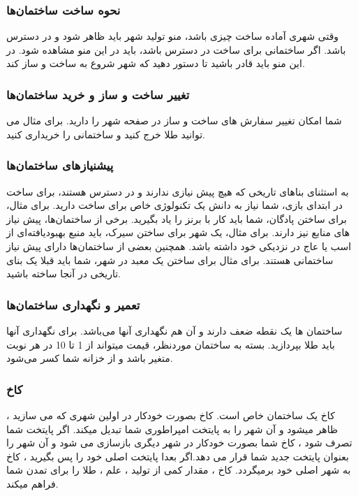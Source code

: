 \documentclass[]{article}
\begin{document}
\subsubsection*{{\titr نحوه ساخت ساختمان‌ها}}
وقتی شهری آماده ساخت چیزی باشد، منو تولید شهر باید ظاهر شود و در دسترس باشد. اگر ساختمانی برای ساخت در دسترس باشد، باید در این منو مشاهده شود. در این منو باید قادر باشید تا دستور دهید که شهر شروع به ساخت و ساز کند.


\subsubsection*{{\titr تغییر ساخت و ساز و خرید ساختمان‌ها}}
شما امکان تغییر سفارش های ساخت و ساز در صفحه شهر را دارید. برای مثال می توانید طلا خرج کنید و ساختمانی را خریداری کنید.


\subsubsection*{{\titr پیشنیاز‌های ساختمان‌ها}}
به استثنای بناهای تاریخی که هیچ پیش نیازی ندارند و در دسترس هستند، برای ساخت در ابتدای بازی، شما نیاز به دانش یک تکنولوژی خاص برای ساخت دارید. برای مثال، برای ساختن پادگان، شما باید کار با برنز را یاد بگیرید.
برخی از ساختمان‌ها، پیش نیاز های منابع نیز دارند. برای مثال، یک شهر برای ساختن سیرک، باید منبع بهبودیافته‌ای از اسب یا عاج در نزدیکی خود داشته باشد.
همچنین بعضی از ساختمان‌ها دارای پیش نیاز ساختمانی هستند. برای مثال برای ساختن یک معبد در شهر، شما باید قبلا یک بنای تاریخی در آنجا ساخته باشید.

\subsubsection*{{\titr تعمیر و نگهداری ساختمان‌ها}}
ساختمان ها یک نقطه ضعف دارند و آن هم نگهداری آنها می‌باشد. برای نگهداری آنها باید طلا بپردازید. بسته به ساختمان موردنظر‌، قیمت میتواند از 1 تا 10 در هر نوبت متغیر باشد و از خزانه شما کسر می‌شود.


\subsubsection*{{\titr کاخ}}
کاخ یک ساختمان خاص است. کاخ بصورت خودکار در اولین شهری که می سازید ، ظاهر میشود و آن شهر را به پایتخت امپراطوری شما تبدیل میکند. اگر پایتخت شما تصرف شود ، کاخ شما بصورت خودکار در شهر دیگری بازسازی می شود و آن شهر را بعنوان پایتخت جدید شما قرار می دهد.اگر بعدا پایتخت اصلی خود را پس بگیرید ، کاخ به شهر اصلی خود برمیگردد.
کاخ ، مقدار کمی از تولید ، علم ، طلا را برای تمدن شما فراهم میکند. 
\end{document}
